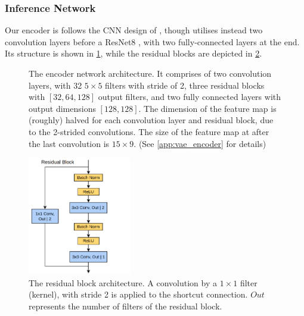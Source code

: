 \subsubsection{Inference Network}
\label{subsubsec:5_vae_inference_network}
Our encoder is follows the CNN design of \cite{deepCollisionPredictorOracle}, though utilises instead two convolution layers before a ResNet8 \cite{KaimingResNet}, with two fully-connected layers at the end. Its structure is shown in \cref{fig:5_encoder}, while the residual blocks are depicted in \cref{fig:5_res_block}.
\begin{figure}[H]
    \centering
    \caption{The encoder network architecture. It comprises of two convolution layers, with 32 $5\times5$ filters with stride of 2, three residual blocks with $[32, 64, 128]$ output filters, and two fully connected layers with output dimensions $[128, 128]$. The dimension of the feature map is (roughly) halved for each convolution layer and residual block, due to the 2-strided convolutions. The size of the feature map at after the last convolution is $15\times9$. (See \cref{app:vae_encoder} for details)}
    \label{fig:5_encoder}
\end{figure}
\begin{figure}[H]
    \centering
    \includegraphics[width=0.4\textwidth]{figures/5_/5_res_block.png}
    \caption{The residual block architecture. A convolution by a $1\times1$ filter (kernel), with stride 2 is applied to the shortcut connection. $Out$ represents the number of filters of the residual block.}
    \label{fig:5_res_block}
\end{figure}
